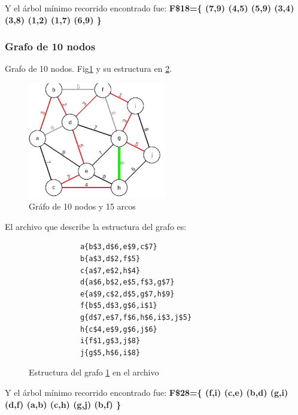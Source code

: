         Y el árbol mínimo recorrido encontrado fue: \textbf{F\$18=\{ (7,9)  (4,5)  (5,9)  (3,4)  (3,8)  (1,2)  (1,7)  (6,9) \}}
    
    \newpage
    
        \subsubsection*{Grafo de 10 nodos}
        Grafo de 10 nodos. Fig\ref{Grafo10} y su estructura en \ref{ArchivoGrafo10}.
        
        \begin{figure}[h!]
            \centering
            \includegraphics[width=6cm]{Kruskal/Grafo10.jpeg}
            \caption{Gráfo de 10 nodos y 15 arcos}
            \label{Grafo10}
        \end{figure}
            
        El archivo que describe la estructura del grafo es:
        \begin{figure}[h!]
            \centering
            \begin{verbatim}
            a{b$3,d$6,e$9,c$7}
            b{a$3,d$2,f$5}
            c{a$7,e$2,h$4}
            d{a$6,b$2,e$5,f$3,g$7}
            e{a$9,c$2,d$5,g$7,h$9}
            f{b$5,d$3,g$6,i$1}
            g{d$7,e$7,f$6,h$6,i$3,j$5}
            h{c$4,e$9,g$6,j$6}
            i{f$1,g$3,j$8}
            j{g$5,h$6,i$8}\end{verbatim}
            \caption{Estructura del grafo \ref{Grafo10} en el archivo}
            \label{ArchivoGrafo10}
        \end{figure} 
        
        Y el árbol mínimo recorrido encontrado fue: \textbf{F\$28=\{ (f,i)  (c,e)  (b,d)  (g,i)  (d,f)  (a,b)  (c,h)  (g,j)  (b,f) \}}
        
        \newpage
        
